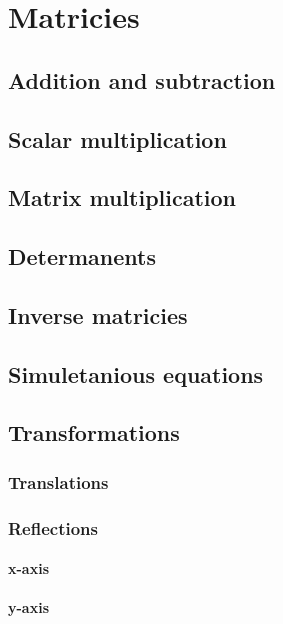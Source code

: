 \documentclass{book}
\begin{document}
\chapter{Matricies}
\section{Addition and subtraction}

\section{Scalar multiplication}

\section{Matrix multiplication}

\section{Determanents}

\section{Inverse matricies}

\section{Simuletanious equations}

\section{Transformations}
\subsection{Translations}

\subsection{Reflections}
\subsubsection{x-axis}

\subsubsection{y-axis}
\end{document}
